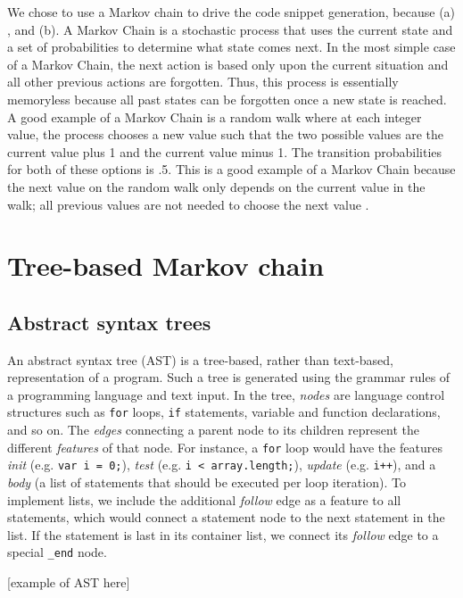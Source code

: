 \documentclass{article}
\begin{document}
We chose to use a Markov chain to drive the code snippet generation, because
(a) , and (b). A Markov Chain is a stochastic process
that uses the current state and a set of probabilities to determine what state
comes next. In the most simple case of a Markov Chain, the next action is based
only upon the current situation and all other previous actions are forgotten.
Thus, this process is essentially memoryless because all past states can be
forgotten once a new state is reached. A good example of a Markov Chain is a
random walk where at each integer value, the process chooses a new value such
that the two possible values are the current value plus 1 and the current value
minus 1. The transition probabilities for both of these options is .5. This is a
good example of a Markov Chain because the next value on the random walk only
depends on the current value in the walk; all previous values are not needed to
choose the next value \cite{markov}. 


\section{Tree-based Markov chain}

\subsection{Abstract syntax trees}

An abstract syntax tree (AST) is a tree-based, rather than text-based, representation of a program.
Such a tree is generated using the grammar rules of a programming language and text input. In the tree, \emph{nodes}
are language control structures such as {\tt for} loops, {\tt if} statements, variable and function
declarations, and so on. The \emph{edges} connecting a parent node to its children represent the different \emph{features}
of that node. For instance, a {\tt for} loop would have the features \emph{init} (e.g. {\tt var i = 0;}),
\emph{test} (e.g. {\tt i < array.length;}), \emph{update} (e.g. {\tt i++}), and a \emph{body} (a list
of statements that should be executed per loop iteration). To implement lists, we include the additional
\emph{follow} edge as a feature to all statements, which would connect a statement node to the next statement
in the list. If the statement is last in its container list, we connect its \emph{follow} edge to a special
{\tt {\_end}} node.

\begin{center}

[example of AST here]




\end{center}
\end{document}
